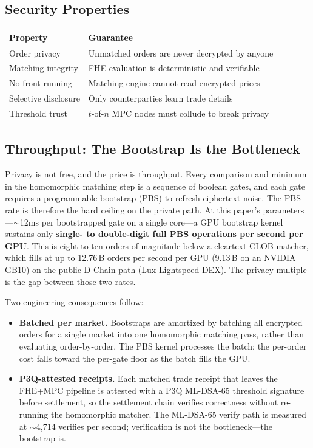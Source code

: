 \subsection{Security Properties}

\begin{center}
\begin{tabular}{ll}
\toprule
\textbf{Property} & \textbf{Guarantee} \\
\midrule
Order privacy & Unmatched orders are never decrypted by anyone \\
Matching integrity & FHE evaluation is deterministic and verifiable \\
No front-running & Matching engine cannot read encrypted prices \\
Selective disclosure & Only counterparties learn trade details \\
Threshold trust & $t$-of-$n$ MPC nodes must collude to break privacy \\
\bottomrule
\end{tabular}
\end{center}

\subsection{Throughput: The Bootstrap Is the Bottleneck}

Privacy is not free, and the price is throughput. Every comparison and
minimum in the homomorphic matching step is a sequence of boolean gates,
and each gate requires a programmable bootstrap (PBS) to refresh
ciphertext noise. The PBS rate is therefore the hard ceiling on the
private path. At this paper's parameters---$\sim$12ms per bootstrapped
gate on a single core---a GPU bootstrap kernel sustains only
\textbf{single- to double-digit full PBS operations per second per GPU}.
This is eight to ten orders of magnitude below a cleartext CLOB matcher,
which fills at up to 12.76\,B orders per second per GPU (9.13\,B on an
NVIDIA GB10) on the public D-Chain path (Lux Lightspeed DEX). The privacy
multiple is the gap between those two rates.

Two engineering consequences follow:

\begin{itemize}[leftmargin=2em,nosep]
  \item \textbf{Batched per market.} Bootstraps are amortized by
    batching all encrypted orders for a single market into one
    homomorphic matching pass, rather than evaluating order-by-order.
    The PBS kernel processes the batch; the per-order cost falls toward
    the per-gate floor as the batch fills the GPU.
  \item \textbf{P3Q-attested receipts.} Each matched trade receipt that
    leaves the FHE+MPC pipeline is attested with a P3Q ML-DSA-65
    threshold signature before settlement, so the settlement chain
    verifies correctness without re-running the homomorphic matcher. The
    ML-DSA-65 verify path is measured at $\sim$4{,}714 verifies per
    second; verification is not the bottleneck---the bootstrap is.
\end{itemize}

